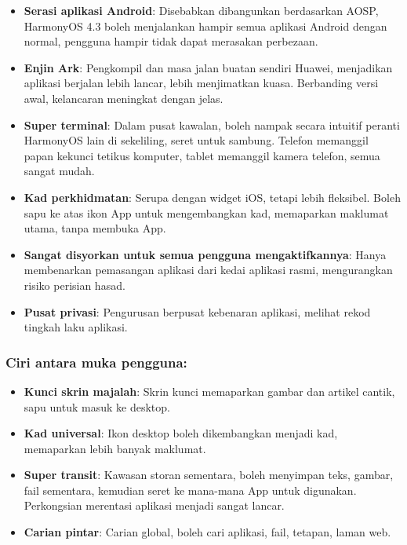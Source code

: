\begin{itemize}
  \item \textbf{Serasi aplikasi Android}: Disebabkan dibangunkan berdasarkan AOSP, HarmonyOS 4.3 boleh menjalankan hampir semua aplikasi Android dengan normal, pengguna hampir tidak dapat merasakan perbezaan.
  \item \textbf{Enjin Ark}: Pengkompil dan masa jalan buatan sendiri Huawei, menjadikan aplikasi berjalan lebih lancar, lebih menjimatkan kuasa. Berbanding versi awal, kelancaran meningkat dengan jelas.
  \item \textbf{Super terminal}: Dalam pusat kawalan, boleh nampak secara intuitif peranti HarmonyOS lain di sekeliling, seret untuk sambung. Telefon memanggil papan kekunci tetikus komputer, tablet memanggil kamera telefon, semua sangat mudah.
  \item \textbf{Kad perkhidmatan}: Serupa dengan widget iOS, tetapi lebih fleksibel. Boleh sapu ke atas ikon App untuk mengembangkan kad, memaparkan maklumat utama, tanpa membuka App.
  \item \textbf{Sangat disyorkan untuk semua pengguna mengaktifkannya}: Hanya membenarkan pemasangan aplikasi dari kedai aplikasi rasmi, mengurangkan risiko perisian hasad.
  \item \textbf{Pusat privasi}: Pengurusan berpusat kebenaran aplikasi, melihat rekod tingkah laku aplikasi.
\end{itemize}

\subsubsection*{Ciri antara muka pengguna:}

\begin{itemize}
  \item \textbf{Kunci skrin majalah}: Skrin kunci memaparkan gambar dan artikel cantik, sapu untuk masuk ke desktop.
  \item \textbf{Kad universal}: Ikon desktop boleh dikembangkan menjadi kad, memaparkan lebih banyak maklumat.
  \item \textbf{Super transit}: Kawasan storan sementara, boleh menyimpan teks, gambar, fail sementara, kemudian seret ke mana-mana App untuk digunakan. Perkongsian merentasi aplikasi menjadi sangat lancar.
  \item \textbf{Carian pintar}: Carian global, boleh cari aplikasi, fail, tetapan, laman web.
\end{itemize}


